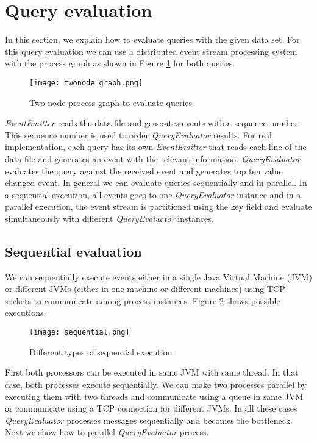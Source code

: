 \section{Query evaluation}

In this section, we explain how to evaluate queries with the given data set. For this query evaluation we can use a distributed event stream processing system with the process graph as shown in Figure \ref{twonode_graph} for both queries.

\begin{figure}[!t]
        \centering
        \texttt{[image: twonode\_graph.png]}
        \caption{Two node process graph to evaluate queries}
        \label{twonode_graph}
\end{figure}

\textit{EventEmitter} reads the data file and generates events with a sequence number. This sequence number is used to order \textit{QueryEvaluator} results. For real implementation, each query has its own \textit{EventEmitter} that reads each line of the data file and generates an event with the relevant information. \textit{QueryEvaluator} evaluates the query against the received event and generates top ten value changed event.  In general we can evaluate queries sequentially and in parallel. In a sequential execution, all events goes to one \textit{QueryEvaluator} instance and in a parallel execution, the event stream is partitioned using the key field and evaluate simultaneously with different \textit{QueryEvaluator} instances.

\subsection{Sequential evaluation}

We can sequentially execute events either in a single Java Virtual Machine (JVM) or different JVMs (either in one machine or different machines) using TCP sockets to communicate among process instances. Figure \ref{sequential} shows possible executions. 

\begin{figure}[!t]
        \centering
        \texttt{[image: sequential.png]}
        \caption{Different types of sequential execution}
        \label{sequential}
\end{figure}

First both processors can be executed in same JVM with same thread. In that case, both processes execute sequentially. We can make two processes parallel by executing them with two threads and communicate using a queue in same JVM or communicate using a TCP connection for different JVMs. In all these cases \textit{QueryEvaluator} processes messages sequentially and becomes the bottleneck. Next we show how to parallel \textit{QueryEvaluator} process. 

